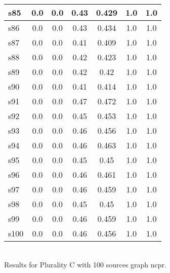 \documentclass{article}
\begin{document}
\begin{tabular}{|l|c|c|c|c|c|c|}
\hline
s85 &0.0 & 0.0 & 0.43 & 0.429 & 1.0 & 1.0\\
\hline
s86 &0.0 & 0.0 & 0.43 & 0.434 & 1.0 & 1.0\\
\hline
s87 &0.0 & 0.0 & 0.41 & 0.409 & 1.0 & 1.0\\
\hline
s88 &0.0 & 0.0 & 0.42 & 0.423 & 1.0 & 1.0\\
\hline
s89 &0.0 & 0.0 & 0.42 & 0.42 & 1.0 & 1.0\\
\hline
s90 &0.0 & 0.0 & 0.41 & 0.414 & 1.0 & 1.0\\
\hline
s91 &0.0 & 0.0 & 0.47 & 0.472 & 1.0 & 1.0\\
\hline
s92 &0.0 & 0.0 & 0.45 & 0.453 & 1.0 & 1.0\\
\hline
s93 &0.0 & 0.0 & 0.46 & 0.456 & 1.0 & 1.0\\
\hline
s94 &0.0 & 0.0 & 0.46 & 0.463 & 1.0 & 1.0\\
\hline
s95 &0.0 & 0.0 & 0.45 & 0.45 & 1.0 & 1.0\\
\hline
s96 &0.0 & 0.0 & 0.46 & 0.461 & 1.0 & 1.0\\
\hline
s97 &0.0 & 0.0 & 0.46 & 0.459 & 1.0 & 1.0\\
\hline
s98 &0.0 & 0.0 & 0.45 & 0.45 & 1.0 & 1.0\\
\hline
s99 &0.0 & 0.0 & 0.46 & 0.459 & 1.0 & 1.0\\
\hline
s100 &0.0 & 0.0 & 0.46 & 0.456 & 1.0 & 1.0\\
\hline
\end{tabular}\\

\noindent Results for Plurality C with 100 sources graph ncpr.
\end{document}
